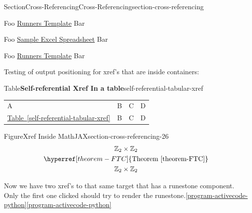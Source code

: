 \documentclass[twoside,10pt,]{article}
\newcommand{\tabularfont}{\relax}
\newcommand{\xreffont}{\relax}
\numberwithin{equation}{section}
\newcommand{\hrulemedium}{\noalign{\hrule height 0.07em}}
\begin{document}
\begin{sectionptx}{Section}{Cross-Referencing}{}{Cross-Referencing}{}{}{section-cross-referencing}
\par
Foo \href{https://pretextbook.org/examples/sample-article/html/external/data/spreadsheet/runningstatisticstemplate.ots}{Runners Template} Bar%
\par
Foo \href{http://go.microsoft.com/fwlink/?LinkID=521962}{Sample Excel Spreadsheet} Bar%
\par
Foo \href{https://pretextbook.org/examples/sample-article/html/external/data/spreadsheet/runningstatisticstemplate.ots}{Runners Template} Bar%
\par
Testing of output positioning for xref's that are inside containers:%
\begin{tableptx}{Table}{\textbf{Self-referential Xref In a table}}{self-referential-tabular-xref}{}%
\centering%
{\tabularfont%
\begin{tabular}{llll}
A&B&C&D\tabularnewline\hrulemedium
\hyperref[self-referential-tabular-xref]{Table~{\xreffont\ref{self-referential-tabular-xref}}}&B&C&D
\end{tabular}
}%
\end{tableptx}%
\begin{figureptx}{Figure}{Xref Inside MathJAX}{section-cross-referencing-26}{}%
\centering
%
\begin{gather*}
{\mathbb Z}_2 \times {\mathbb Z}_2\\
\hyperref[theorem-FTC]{\text{Theorem {\xreffont\ref{theorem-FTC}}}}\\
{\mathbb Z}_2 \times {\mathbb Z}_2
\end{gather*}
%
\tcblower
\end{figureptx}%
Now we have two xref's to that same target that has a runestone component. Only the first one clicked should try to render the runestone.\hyperref[program-activecode-python]{{\xreffont\ref{program-activecode-python}}}\hyperref[program-activecode-python]{{\xreffont\ref{program-activecode-python}}}%
\end{sectionptx}
%
%
\typeout{************************************************}
\typeout{************************************************}
%
\end{document}
